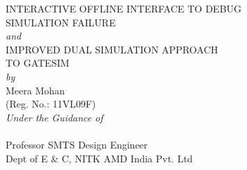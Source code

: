 \documentclass[a4paper,12pt]{report}
\begin{document}
\begin{titlepage}
\begin{center}
{\Large INTERACTIVE OFFLINE INTERFACE TO DEBUG}\\
\vspace{3.5pt}
{\Large SIMULATION FAILURE}\\
\vspace{7pt}
{\emph{and}}\\
\vspace{7pt}
{\Large IMPROVED DUAL SIMULATION APPROACH}\\
\vspace{3.5pt}
{\Large TO GATESIM}\\

\vspace{15pt}
\textit {by} \\
\vspace{10pt}
{\Large {Meera Mohan}}\\ 
{(Reg. No.: 11VL09F)}\\
\vspace{15pt}
{\em Under the Guidance of} \\
\vspace{10pt}
 \\
\hspace{-0.05in} Professor \hspace{2in} SMTS Design Engineer\\
\hspace{-0.45in}Dept of E \& C, NITK \hspace{1.65in} AMD India Pvt. Ltd\\

\vspace{-0.05in}
\begin{table}[H]
   \hspace{.3in}  \begin{tabular}{ccc}	
	 			

\end{tabular}
\end{table}
\end{center}
\end{titlepage}
\end{document}

